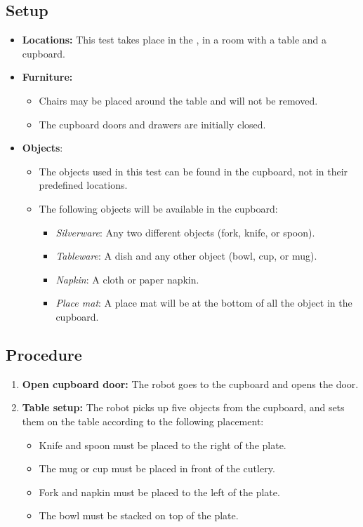 \subsection*{Setup}
\begin{itemize}[nosep]
	\item \textbf{Locations:} This test takes place in the \Arena{}, in a room with a table and a cupboard.
	\item \textbf{Furniture:}
		\begin{itemize}
		 \item Chairs may be placed around the table and will not be removed.
		 \item The cupboard doors and drawers are initially closed.
		\end{itemize}
	\item \textbf{Objects}: 
	\begin{itemize}
		 \item 	The objects used in this test can be found in the cupboard, not in their predefined locations.
		 \item The following objects will be available in the cupboard:
		 \begin{itemize}
			\item\textit{Silverware}: Any two different objects (fork, knife, or spoon).
			\item\textit{Tableware}: A dish and any other object (bowl, cup, or mug).
			\item\textit{Napkin}: A cloth or paper napkin.
			\item\textit{Place mat}: A place mat will be at the bottom of all the object in the cupboard.
		 \end{itemize}
		 
		\end{itemize}
\end{itemize}

\subsection*{Procedure}
\begin{enumerate}[nosep]

	\item \textbf{Open cupboard door:} The robot goes to the cupboard and opens the door.
	\item \textbf{Table setup:} The robot picks up five objects from the cupboard, and sets them on the table according to the following placement: 
		\begin{itemize}[nosep]
		 \item Knife and spoon must be placed to the right of the plate.
		 \item The mug or cup must be placed in front of the cutlery.
		 \item Fork and napkin must be placed to the left of the plate.
		 \item The bowl must be stacked on top of the plate.
		\end{itemize}

\end{enumerate}



